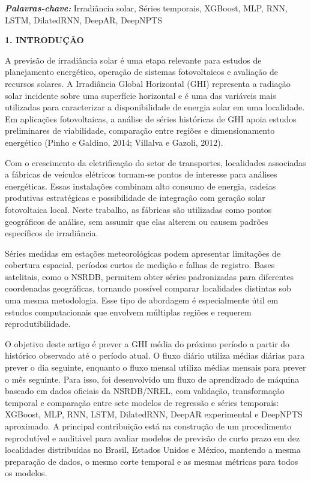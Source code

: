 \documentclass[12pt,a4paper]{article}
\begin{document}
\vspace{12pt}

\noindent\textbf{\textit{Palavras-chave:}} Irradiância solar, Séries temporais, XGBoost, MLP, RNN, LSTM, DilatedRNN, DeepAR, DeepNPTS
\endgroup

\vspace{24pt}

\noindent\textbf{1. INTRODUÇÃO}

A previsão de irradiância solar é uma etapa relevante para estudos de planejamento energético, operação de sistemas fotovoltaicos e avaliação de recursos solares. A Irradiância Global Horizontal (GHI) representa a radiação solar incidente sobre uma superfície horizontal e é uma das variáveis mais utilizadas para caracterizar a disponibilidade de energia solar em uma localidade. Em aplicações fotovoltaicas, a análise de séries históricas de GHI apoia estudos preliminares de viabilidade, comparação entre regiões e dimensionamento energético (Pinho e Galdino, 2014; Villalva e Gazoli, 2012).

Com o crescimento da eletrificação do setor de transportes, localidades associadas a fábricas de veículos elétricos tornam-se pontos de interesse para análises energéticas. Essas instalações combinam alto consumo de energia, cadeias produtivas estratégicas e possibilidade de integração com geração solar fotovoltaica local. Neste trabalho, as fábricas são utilizadas como pontos geográficos de análise, sem assumir que elas alterem ou causem padrões específicos de irradiância.

Séries medidas em estações meteorológicas podem apresentar limitações de cobertura espacial, períodos curtos de medição e falhas de registro. Bases satelitais, como o NSRDB, permitem obter séries padronizadas para diferentes coordenadas geográficas, tornando possível comparar localidades distintas sob uma mesma metodologia. Esse tipo de abordagem é especialmente útil em estudos computacionais que envolvem múltiplas regiões e requerem reprodutibilidade.

O objetivo deste artigo é prever a GHI média do próximo período a partir do histórico observado até o período atual. O fluxo diário utiliza médias diárias para prever o dia seguinte, enquanto o fluxo mensal utiliza médias mensais para prever o mês seguinte. Para isso, foi desenvolvido um fluxo de aprendizado de máquina baseado em dados oficiais da NSRDB/NREL, com validação, transformação temporal e comparação entre sete modelos de regressão e séries temporais: XGBoost, MLP, RNN, LSTM, DilatedRNN, DeepAR experimental e DeepNPTS aproximado. A principal contribuição está na construção de um procedimento reprodutível e auditável para avaliar modelos de previsão de curto prazo em dez localidades distribuídas no Brasil, Estados Unidos e México, mantendo a mesma preparação de dados, o mesmo corte temporal e as mesmas métricas para todos os modelos.
\end{document}
